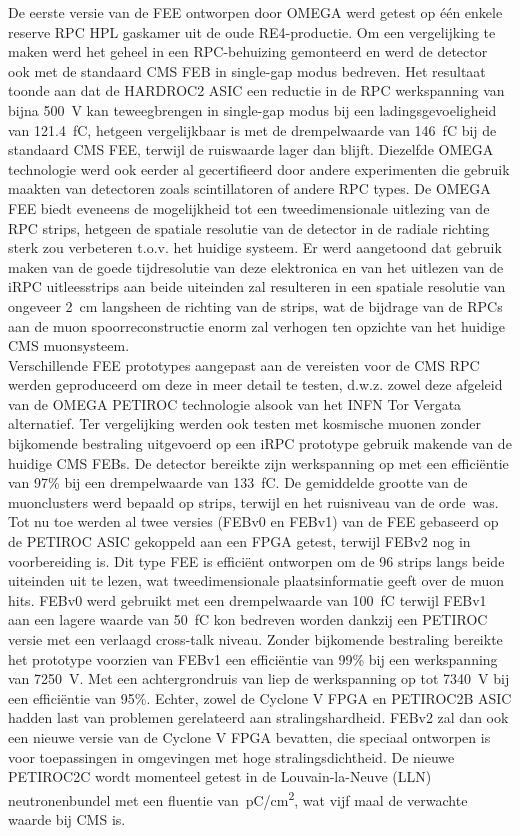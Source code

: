	De eerste versie van de FEE ontworpen door OMEGA werd getest op \'e\'en enkele reserve RPC HPL gaskamer uit de oude RE4-productie. Om een vergelijking te maken werd het geheel in een RPC-behuizing gemonteerd en werd de detector ook met de standaard CMS FEB in single-gap modus bedreven. Het resultaat toonde aan dat de HARDROC2 ASIC een reductie in de RPC werkspanning van bijna \SI{500}{V} kan teweegbrengen in single-gap modus bij een ladingsgevoeligheid van \SI{121.4}{fC}, hetgeen vergelijkbaar is met de drempelwaarde van \SI{146}{fC} bij de standaard CMS FEE, terwijl de ruiswaarde lager dan  blijft. Diezelfde OMEGA technologie werd ook eerder al gecertifieerd door andere experimenten die gebruik maakten van detectoren zoals scintillatoren of andere RPC types. De OMEGA FEE biedt eveneens de mogelijkheid tot een tweedimensionale uitlezing van de RPC strips, hetgeen de spatiale resolutie van de detector in de radiale richting sterk zou verbeteren t.o.v. het huidige systeem. Er werd aangetoond dat gebruik maken van de goede tijdresolutie van deze elektronica en van het uitlezen van de iRPC uitleesstrips aan beide uiteinden zal resulteren in een spatiale resolutie van ongeveer \SI{2}{cm} langsheen de richting van de strips, wat de bijdrage van de RPCs aan de muon spoorreconstructie enorm zal verhogen ten opzichte van het huidige CMS muonsysteem.\\
	Verschillende FEE prototypes aangepast aan de vereisten voor de CMS RPC werden geproduceerd om deze in meer detail te testen, d.w.z. zowel deze afgeleid van de OMEGA PETIROC technologie alsook van het INFN Tor Vergata alternatief. Ter vergelijking werden ook testen met kosmische muonen zonder bijkomende bestraling uitgevoerd op een iRPC prototype gebruik makende van de huidige CMS FEBs. De detector bereikte zijn werkspanning op  met een efficiëntie van 97\% bij een drempelwaarde van \SI{133}{fC}. De gemiddelde grootte van de muonclusters werd bepaald op  strips, terwijl en het ruisniveau van de orde \,\sirate was.\\
	Tot nu toe werden al twee versies (FEBv0 en FEBv1) van de FEE gebaseerd op de PETIROC ASIC gekoppeld aan een FPGA getest, terwijl FEBv2 nog in voorbereiding is. Dit type FEE is efficiënt ontworpen om de 96 strips langs beide uiteinden uit te lezen, wat tweedimensionale plaatsinformatie geeft over de muon hits. FEBv0 werd gebruikt met een drempelwaarde van \SI{100}{fC} terwijl FEBv1 aan een lagere waarde van \SI{50}{fC} kon bedreven worden dankzij een PETIROC versie met een verlaagd cross-talk niveau. Zonder bijkomende bestraling bereikte het prototype voorzien van FEBv1 een efficiëntie van 99\% bij een werkspanning van \SI{7250}{V}. Met een achtergrondruis van  liep de werkspanning op tot \SI{7340}{V} bij een efficiëntie van 95\%. Echter, zowel de Cyclone V FPGA en PETIROC2B ASIC hadden last van problemen gerelateerd aan stralingshardheid. FEBv2 zal dan ook een nieuwe versie van de Cyclone V FPGA bevatten, die speciaal ontworpen is voor toepassingen in omgevingen met hoge stralingsdichtheid. De nieuwe PETIROC2C wordt momenteel getest in de Louvain-la-Neuve (LLN) neutronenbundel met een fluentie van \,\si{pC/cm^2}, wat vijf maal de verwachte waarde bij CMS is.\\
